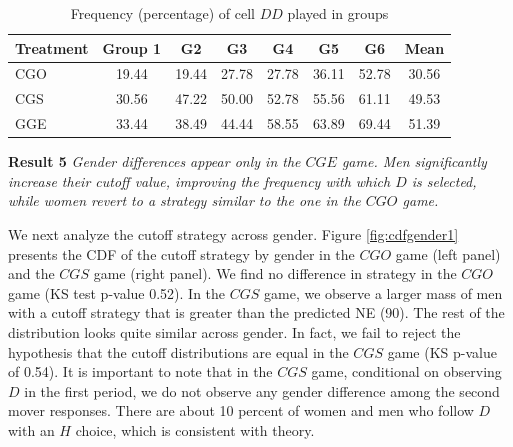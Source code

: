 \documentclass[12pt,english]{article}
\begin{document}
\begin{table}[!t]
\centering
\caption{Frequency (percentage) of cell $DD$ played in groups }
\begin{tabular}{lccccccc}
\hline
Treatment & Group 1 & G2  & G3 & G4 & G5 & G6 & Mean\\
  \hline
  CGO &  19.44 & 19.44&  27.78 & 27.78 & 36.11 & 52.78 & 30.56 \\
  CGS & 30.56 & 47.22&  50.00 & 52.78 & 55.56 & 61.11 & 49.53\\
  GGE & 33.44 & 38.49 & 44.44 & 58.55 & 63.89 & 69.44 & 51.39 \\
  \hline

\end{tabular}

\label{table:dd}
\end{table}

\noindent \textbf{Result 5}
\textit{Gender differences appear only in the $CGE$ game. Men significantly increase their cutoff value, improving the frequency with which $D$ is selected, while women revert to a strategy similar to the one in the $CGO$ game.}

We next analyze the cutoff strategy across gender. Figure \ref{fig:cdfgender1} presents the CDF of the cutoff strategy by gender in the $CGO$ game (left panel) and the $CGS$  game (right panel). We find no difference in strategy in the $CGO$ game (KS test p-value 0.52). In the $CGS$ game, we observe a larger mass of men with a cutoff strategy that is greater than the predicted NE (90). The rest of the distribution looks quite similar across gender. In fact, we fail to reject the hypothesis that the cutoff distributions are equal in the $CGS$ game (KS p-value of 0.54). It is important to note that in the $CGS$ game, conditional on observing $D$ in the first period, we do not observe any gender difference among the second mover responses. There are about 10 percent of women and men who follow $D$ with an $H$ choice, which is consistent with theory.
\end{document}
